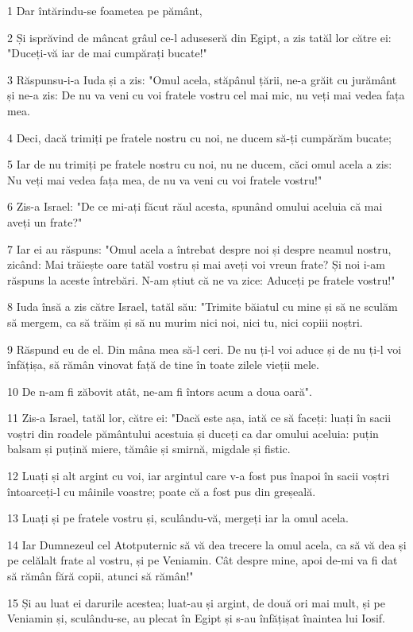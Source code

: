 \par 1 Dar întărindu-se foametea pe pământ,
\par 2 Și isprăvind de mâncat grâul ce-l aduseseră din Egipt, a zis tatăl lor către ei: "Duceți-vă iar de mai cumpărați bucate!"
\par 3 Răspunsu-i-a Iuda și a zis: "Omul acela, stăpânul țării, ne-a grăit cu jurământ și ne-a zis: De nu va veni cu voi fratele vostru cel mai mic, nu veți mai vedea fața mea.
\par 4 Deci, dacă trimiți pe fratele nostru cu noi, ne ducem să-ți cumpărăm bucate;
\par 5 Iar de nu trimiți pe fratele nostru cu noi, nu ne ducem, căci omul acela a zis: Nu veți mai vedea fața mea, de nu va veni cu voi fratele vostru!"
\par 6 Zis-a Israel: "De ce mi-ați făcut răul acesta, spunând omului aceluia că mai aveți un frate?"
\par 7 Iar ei au răspuns: "Omul acela a întrebat despre noi și despre neamul nostru, zicând: Mai trăiește oare tatăl vostru și mai aveți voi vreun frate? Și noi i-am răspuns la aceste întrebări. N-am știut că ne va zice: Aduceți pe fratele vostru!"
\par 8 Iuda însă a zis către Israel, tatăl său: "Trimite băiatul cu mine și să ne sculăm să mergem, ca să trăim și să nu murim nici noi, nici tu, nici copiii noștri.
\par 9 Răspund eu de el. Din mâna mea să-l ceri. De nu ți-l voi aduce și de nu ți-l voi înfățișa, să rămân vinovat față de tine în toate zilele vieții mele.
\par 10 De n-am fi zăbovit atât, ne-am fi întors acum a doua oară".
\par 11 Zis-a Israel, tatăl lor, către ei: "Dacă este așa, iată ce să faceți: luați în sacii voștri din roadele pământului acestuia și duceți ca dar omului aceluia: puțin balsam și puțină miere, tămâie și smirnă, migdale și fistic.
\par 12 Luați și alt argint cu voi, iar argintul care v-a fost pus înapoi în sacii voștri întoarceți-l cu mâinile voastre; poate că a fost pus din greșeală.
\par 13 Luați și pe fratele vostru și, sculându-vă, mergeți iar la omul acela.
\par 14 Iar Dumnezeul cel Atotputernic să vă dea trecere la omul acela, ca să vă dea și pe celălalt frate al vostru, și pe Veniamin. Cât despre mine, apoi de-mi va fi dat să rămân fără copii, atunci să rămân!"
\par 15 Și au luat ei darurile acestea; luat-au și argint, de două ori mai mult, și pe Veniamin și, sculându-se, au plecat în Egipt și s-au înfățișat înaintea lui Iosif.
